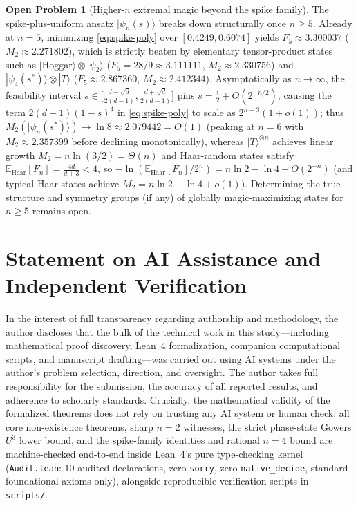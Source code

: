 \documentclass[11pt,a4paper]{article}
\theoremstyle{plain}
\theoremstyle{definition}
\newtheorem{openproblem}{Open Problem}
\theoremstyle{remark}
\newcommand{\ket}[1]{|#1\rangle}
\newcommand{\lean}[1]{\texttt{\small #1}}
\numberwithin{equation}{section}
\begin{document}
\begin{openproblem}[Higher-$n$ extremal magic beyond the spike family]\label{op:higher-n}
The spike-plus-uniform ansatz $\ket{\psi_n(s)}$ breaks down structurally once $n \ge 5$. Already at $n = 5$, minimizing \eqref{eq:spike-poly} over $[0.4249, 0.6074]$ yields $F_5 \approx 3.300037$ ($M_2 \approx 2.271802$), which is strictly beaten by elementary tensor-product states such as $\ket{\mathrm{Hoggar}}\otimes\ket{\psi_2}$ ($F_5 = 28/9 \approx 3.111111$, $M_2 \approx 2.330756$) and $\ket{\psi_4(s^*)}\otimes\ket{T}$ ($F_5 \approx 2.867360$, $M_2 \approx 2.412344$). Asymptotically as $n \to \infty$, the feasibility interval $s \in \bigl[\frac{d-\sqrt{d}}{2(d-1)}, \frac{d+\sqrt{d}}{2(d-1)}\bigr]$ pins $s = \frac{1}{2} + O(2^{-n/2})$, causing the term $2(d-1)(1-s)^4$ in \eqref{eq:spike-poly} to scale as $2^{n-3}(1+o(1))$; thus $M_2(\ket{\psi_n(s^*)}) \to \ln 8 \approx 2.079442 = O(1)$ (peaking at $n = 6$ with $M_2 \approx 2.357399$ before declining monotonically), whereas $\ket{T}^{\otimes n}$ achieves linear growth $M_2 = n\ln(3/2) = \Theta(n)$ and Haar-random states satisfy $\mathbb{E}_{\mathrm{Haar}}[F_n] = \frac{4d}{d+3} < 4$, so $-\ln(\mathbb{E}_{\mathrm{Haar}}[F_n]/2^n) = n\ln 2 - \ln 4 + O(2^{-n})$ (and typical Haar states achieve $M_2 = n\ln 2 - \ln 4 + o(1)$). Determining the true structure and symmetry groups (if any) of globally magic-maximizing states for $n \ge 5$ remains open.
\end{openproblem}

\section*{Statement on AI Assistance and Independent Verification}
In the interest of full transparency regarding authorship and methodology, the author discloses that the bulk of the technical work in this study---including mathematical proof discovery, Lean~4 formalization, companion computational scripts, and manuscript drafting---was carried out using AI systems under the author's problem selection, direction, and oversight. The author takes full responsibility for the submission, the accuracy of all reported results, and adherence to scholarly standards. Crucially, the mathematical validity of the formalized theorems does not rely on trusting any AI system or human check: all core non-existence theorems, sharp $n = 2$ witnesses, the strict phase-state Gowers $U^3$ lower bound, and the spike-family identities and rational $n = 4$ bound are machine-checked end-to-end inside Lean~4's pure type-checking kernel (\lean{Audit.lean}: $10$ audited declarations, zero \lean{sorry}, zero \lean{native\_decide}, standard foundational axioms only), alongside reproducible verification scripts in \lean{scripts/}.

{\sloppy\raggedright


}
\end{document}
